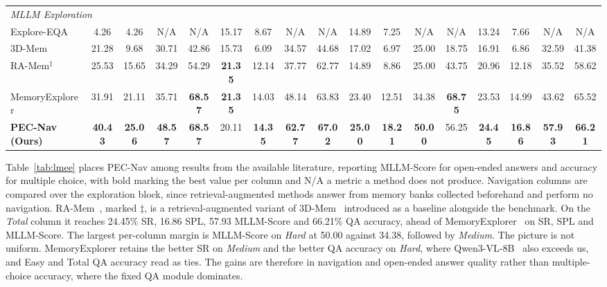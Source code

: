 \begin{table}[htbp]
\begin{tabular}{l|cccc|cccc|cccc|cccc}
\midrule
\multicolumn{17}{l}{\emph{MLLM Exploration}} \\
Explore-EQA~\cite{ren2024exploreeqa} & 4.26 & 4.26 & N/A & N/A & 15.17 & 8.67 & N/A & N/A & 14.89 & 7.25 & N/A & N/A & 13.24 & 7.66 & N/A & N/A \\
3D-Mem~\cite{huang20243dmem} & 21.28 & 9.68 & 30.71 & 42.86 & 15.73 & 6.09 & 34.57 & 44.68 & 17.02 & 6.97 & 25.00 & 18.75 & 16.91 & 6.86 & 32.59 & 41.38 \\
RA-Mem$^{\ddagger}$~\cite{wang2026memoryexplorer} & 25.53 & 15.65 & 34.29 & 54.29 & \textbf{21.35} & 12.14 & 37.77 & 62.77 & 14.89 & 8.86 & 25.00 & 43.75 & 20.96 & 12.18 & 35.52 & 58.62 \\
MemoryExplorer~\cite{wang2026memoryexplorer} & 31.91 & 21.11 & 35.71 & \textbf{68.57} & \textbf{21.35} & 14.03 & 48.14 & 63.83 & 23.40 & 12.51 & 34.38 & \textbf{68.75} & 23.53 & 14.99 & 43.62 & 65.52 \\
\midrule
\textbf{PEC-Nav (Ours)} & \textbf{40.43} & \textbf{25.06} & \textbf{48.57} & \textbf{68.57} & 20.11 & \textbf{14.35} & \textbf{62.77} & \textbf{67.02} & \textbf{25.00} & \textbf{18.21} & \textbf{50.00} & 56.25 & \textbf{24.45} & \textbf{16.86} & \textbf{57.93} & \textbf{66.21} \\
\bottomrule
\end{tabular}
\end{table}

Table~\ref{tab:lmee} places PEC-Nav among results from the available literature, reporting MLLM-Score for open-ended answers and accuracy for multiple choice, with bold marking the best value per column and N/A a metric a method does not produce. Navigation columns are compared over the exploration block, since retrieval-augmented methods answer from memory banks collected beforehand and perform no navigation. RA-Mem~\cite{wang2026memoryexplorer}, marked $\ddagger$, is a retrieval-augmented variant of 3D-Mem~\cite{huang20243dmem} introduced as a baseline alongside the benchmark. On the \emph{Total} column it reaches 24.45\% SR, 16.86 SPL, 57.93 MLLM-Score and 66.21\% QA accuracy, ahead of MemoryExplorer~\cite{wang2026memoryexplorer} on SR, SPL and MLLM-Score. The largest per-column margin is MLLM-Score on \emph{Hard} at 50.00 against 34.38, followed by \emph{Medium}. The picture is not uniform. MemoryExplorer retains the better SR on \emph{Medium} and the better QA accuracy on \emph{Hard}, where Qwen3-VL-8B~\cite{bai2025qwen3} also exceeds us, and Easy and Total QA accuracy read as ties. The gains are therefore in navigation and open-ended answer quality rather than multiple-choice accuracy, where the fixed QA module dominates.

